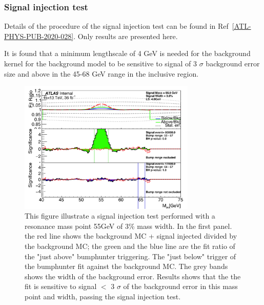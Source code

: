 \subsubsection{Signal injection test} 
\label{sec:signalinjectionresult}


Details of the procedure of the signal injection test can be found in Ref~\ref{ATL-PHYS-PUB-2020-028}. Only results are presented here.

It is found that a minimum lengthscale of 4 GeV is needed for the background kernel for the background model to be sensitive to signal of 3 $\sigma$ background error size and above in the 45-68 GeV range in the inclusive region. %

\begin{figure}[!htb]
    \begin{center}
        \includegraphics[width=0.75\textwidth]{figures/chapter_dimuon/signalInjection}        
        \caption{
        This figure illustrate a signal injection test performed with a resonance mass point 55GeV of 3\% mass width. In the first panel. the red line shows the background MC + signal injected divided by the background MC; the green and the blue line are the fit ratio of the "just above" bumphunter triggering. The "just below" trigger of the bumphunter fit against the background MC. The grey bands shows the width of the background error. Results shows that the the fit is sensitive to signal $<$ 3 $\sigma$ of the background error in this mass point and width, passing the signal injection test. }
    \label{fig:signalinjection}
    \end{center}
\end{figure}
\FloatBarrier

